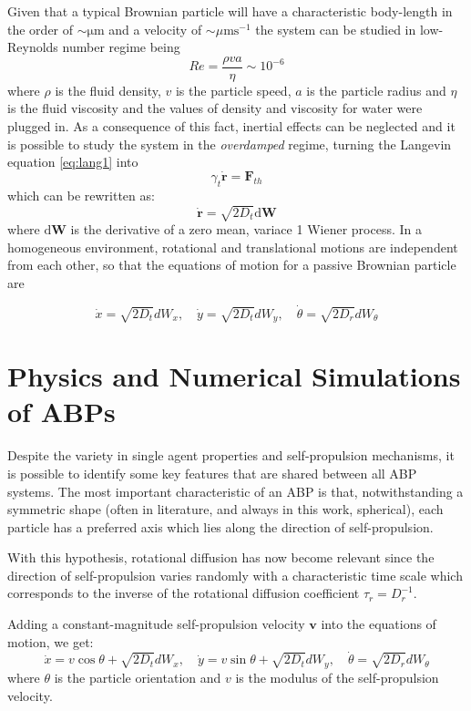 \documentclass[../master_thesis_np.tex]{subfiles}
\begin{document}
	Given that a typical Brownian particle will have a characteristic body-length in the order of $ \mathrm{\sim\mu m}$ and a velocity of $\sim\mu \mathrm{m s}^{-1}$ the system can be studied in low-Reynolds number regime being 
	\[Re = \frac{\rho v a}{\eta} \sim 10^{-6} \]  
	where $\rho$ is the fluid density, $v$ is the particle speed, $a$ is the particle radius and $\eta$ is the fluid viscosity and the values of density and viscosity for water were plugged in. As a consequence of this fact, inertial effects can be neglected and it is possible to study the system in the \emph{overdamped} regime, turning the Langevin equation \ref{eq:lang1} into
	\begin{equation} \label{eq:lang2}
		\gamma_t \mathbf{\dot{r}} = \mathbf{F}_{th}
	\end{equation}
	which can be rewritten as:
	\begin{equation}
		\mathbf{\dot{r}} = \sqrt{2D_t}\mathrm{d}\mathbf{W}
	\end{equation}
	where $\mathrm{d}\mathbf{W}$ is the derivative of a zero mean, variace 1 Wiener process.
	In a homogeneous environment, rotational and translational motions are independent from each other, so that the equations of motion for a passive Brownian particle are
	
	\begin{equation}
		\dot{x} = \sqrt{2D_t}dW_x, \quad \dot{y} = \sqrt{2D_t}dW_y, \quad \dot{\theta} = \sqrt{2D_r}dW_{\theta}
	\end{equation}
	
	\section{Physics and Numerical Simulations of ABPs}
	Despite the variety in single agent properties and self-propulsion mechanisms, it is possible to identify some key features that are shared between all ABP systems. The most important characteristic of an ABP is that, notwithstanding a symmetric shape (often in literature, and always in this work, spherical), each particle has a preferred axis which lies along the direction of self-propulsion.
	
	With this hypothesis, rotational diffusion has now become relevant since the direction of self-propulsion varies randomly with a characteristic time scale which corresponds to the inverse of the rotational diffusion coefficient $\tau_r = D_r^{-1}$. 
	
	Adding a constant-magnitude self-propulsion velocity $\mathbf{v}$ into the equations of motion, we get:
	\begin{equation}
		\dot{x} = v \cos{\theta} + \sqrt{2D_t}dW_x , \quad \dot{y} = v \sin{\theta} + \sqrt{2D_t}dW_y, \quad \dot{\theta} = \sqrt{2D_r}dW_{\theta}
	\end{equation}
	where $\theta$ is the particle orientation and $v$ is the modulus of the self-propulsion velocity.
	
\end{document}
